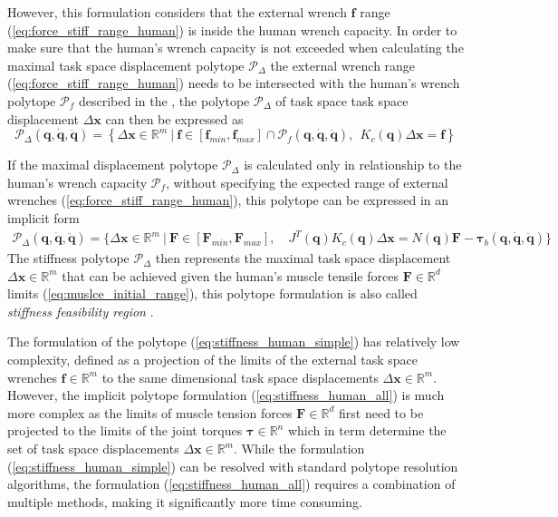 However, this formulation considers that the external wrench $\bm{f}$ range (\ref{eq:force_stiff_range_human}) is inside the human wrench capacity. In order to make sure that the human's wrench capacity is not exceeded when calculating the maximal task space displacement polytope $\mathcal{P}_\Delta$ the external wrench range (\ref{eq:force_stiff_range_human}) needs to be intersected with the human's wrench polytope  $\mathcal{P}_f$ described in the , the polytope $\mathcal{P}_\Delta$ of task space task space displacement $\Delta \bm{x}$ can then be expressed as
\begin{equation}
    \mathcal{P}_\Delta(\bm{q},\dot{\bm{q}},\ddot{\bm{q}}) = \left\{ \Delta\bm{x} \in \mathbb{R}^m ~|~ \bm{f}\in \left[\bm{f}_{min}, \bm{f}_{max} \right] \cap \mathcal{P}_f(\bm{q},\dot{\bm{q}},\ddot{\bm{q}}),  ~~ \! K_c(\bm{q})\Delta\bm{x}=\bm{f}\right\}
\end{equation}

If the maximal displacement polytope $\mathcal{P}_\Delta$ is calculated only in relationship to the human's wrench capacity $\mathcal{P}_f$, without specifying the expected range of external wrenches (\ref{eq:force_stiff_range_human}), this polytope can be expressed in an implicit form
\begin{equation}
\begin{split}
    \mathcal{P}_\Delta(\bm{q},\dot{\bm{q}},\ddot{\bm{q}}) =\! \{ \Delta\bm{x} \in \mathbb{R}^m ~|~\bm{F}\in\left[\bm{F}_{min}, \bm{F}_{max} \right]\!, \quad J^T(\bm{q})K_c(\bm{q})\Delta\bm{x}\!= N(\bm{q})\bm{F}\! -\! \bm{\tau}_b(\bm{q},\dot{\bm{q}},\ddot{\bm{q}}) \}\label{eq:stiffness_human_all}
\end{split}
\end{equation}
The stiffness polytope $\mathcal{P}_\Delta$ then represents the maximal task space displacement $\Delta \bm{x} \in \mathbb{R}^m$ that can be achieved given the human's muscle tensile forces $\bm{F} \in \mathbb{R}^d$ limits (\ref{eq:muslce_initial_range}), this polytope formulation is also called \textit{stiffness feasibility region} \cite{ajoudani2017choosing}.

The formulation of the polytope (\ref{eq:stiffness_human_simple}) has relatively low complexity, defined as a projection of the limits of the external task space wrenches $\bm{f} \in \mathbb{R}^m$ to the same dimensional task space displacements $\Delta \bm{x} \in \mathbb{R}^m$. However, the implicit polytope formulation (\ref{eq:stiffness_human_all}) is much more complex as the limits of muscle tension forces $\bm{F} \in \mathbb{R}^d$ first need to be projected to the limits of the joint torques $\bm{\tau} \in \mathbb{R}^n$ which in term determine the set of task space displacements $\Delta \bm{x} \in \mathbb{R}^m$. While the formulation  (\ref{eq:stiffness_human_simple}) can be resolved with standard polytope resolution algorithms, the formulation (\ref{eq:stiffness_human_all}) requires a combination of multiple methods, making it significantly more time consuming. 

